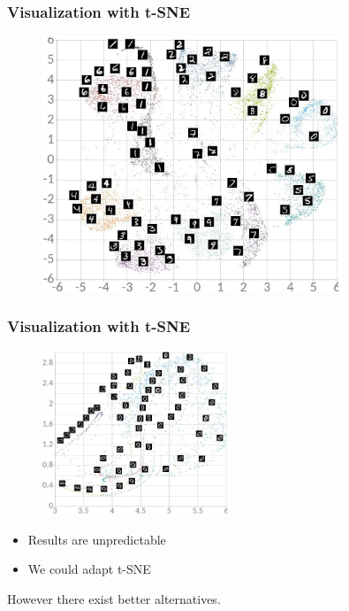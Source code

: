 \documentclass[10pt]{beamer}
\begin{document}
\begin{frame}
    \frametitle{Visualization with t-SNE}
    \begin{figure}[h]
        \begin{center}
            \includegraphics[width=0.8\textwidth]{../report/thesis_figures/mnist_nda_tsne.jpg}
        \end{center}
    \end{figure}
\end{frame}

\begin{frame}
    \frametitle{Visualization with t-SNE}
    \begin{figure}[h]
        \begin{center}
            \includegraphics[width=0.5\textwidth]{../report/thesis_figures/mnist_nda_tsne2.jpg}
        \end{center}
    \end{figure}
    \begin{itemize}
        \item Results are unpredictable
        \item We could adapt t-SNE
    \end{itemize}
    However there exist better alternatives.


\end{frame}
\end{document}
